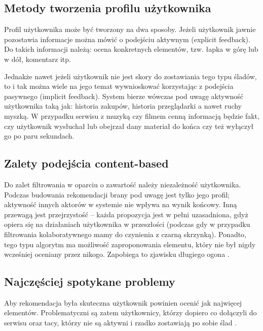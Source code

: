 \documentclass[twoside]{iisthesis}
\begin{document}
	 \subsection{Metody tworzenia profilu użytkownika}
	 \label{ss:metody_tworzenia_profilu_uzytkownika}
	 
	 Profil użytkownika może być tworzony na dwa sposoby. Jeżeli użytkownik jawnie pozostawia informacje można mówić o podejściu aktywnym (explicit feedback). Do takich informacji należą: ocena konkretnych elementów, tzw. łapka w górę lub w dół, komentarz itp. 
	 
	 Jednakże nawet jeżeli użytkownik nie jest skory do zostawiania tego typu śladów, to i tak można wiele na jego temat wywnioskować korzystając z podejścia pasywnego (implicit feedback). System bierze wówczas pod uwagę aktywność użytkownika taką jak: historia zakupów, historia przeglądarki a nawet ruchy myszką. W przypadku serwisu z muzyką czy filmem cenną informacją będzie fakt, czy użytkownik wysłuchał lub obejrzał dany materiał do końca czy też wyłączył go po paru sekundach. \cite{id:ContentBasedRecommenderSystemsState}\cite{id:AdvancesInCollaborativeFiltering}
	 
	 \subsection{Zalety podejścia content-based}
	 
	 Do zalet filtrowania w oparciu o zawartość należy niezależność użytkownika. Podczas budowania rekomendacji brany pod uwagę jest tylko jego profil; aktywność innych aktorów w systemie nie wpływa na wynik końcowy. Inną przewagą jest przejrzystość -- każda propozycja jest w pełni uzasadniona, gdyż opiera się na działaniach użytkownika w przeszłości (podczas gdy w przypadku filtrowania kolaboratywnego mamy do czynienia z czarną skrzynką). Ponadto, tego typu algorytm ma możliwość zaproponowania elementu, który nie był nigdy wcześniej oceniany przez nikogo. Zapobiega to zjawisku długiego ogona	 \cite{id:ContentBasedRecommenderSystemsState}.
	 
	 \subsection{Najczęściej spotykane problemy}
	 Aby rekomendacja była skuteczna użytkownik powinien ocenić jak najwięcej elementów. Problematyczni są zatem użytkownicy, którzy dopiero co dołączyli do serwisu oraz tacy, którzy nie są aktywni i rzadko zostawiają po sobie ślad 	 \cite{id:MaleszkaMianowskaNguyenmethod}.
	 
\end{document}
